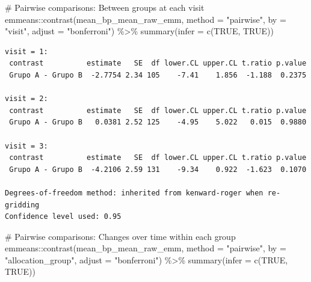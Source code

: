 \documentclass[
  letterpaper,
  DIV=11,
  numbers=noendperiod]{scrartcl}
\newenvironment{Shaded}{\begin{snugshade}}{\end{snugshade}}
\newcommand{\AttributeTok}[1]{\textcolor[rgb]{0.40,0.45,0.13}{#1}}
\newcommand{\CommentTok}[1]{\textcolor[rgb]{0.37,0.37,0.37}{#1}}
\newcommand{\ConstantTok}[1]{\textcolor[rgb]{0.56,0.35,0.01}{#1}}
\newcommand{\FunctionTok}[1]{\textcolor[rgb]{0.28,0.35,0.67}{#1}}
\newcommand{\NormalTok}[1]{\textcolor[rgb]{0.00,0.23,0.31}{#1}}
\newcommand{\SpecialCharTok}[1]{\textcolor[rgb]{0.37,0.37,0.37}{#1}}
\newcommand{\StringTok}[1]{\textcolor[rgb]{0.13,0.47,0.30}{#1}}
\begin{document}
\begin{Shaded}
\begin{Highlighting}[]
\CommentTok{\# Pairwise comparisons: Between groups at each visit}
\NormalTok{emmeans}\SpecialCharTok{::}\FunctionTok{contrast}\NormalTok{(mean\_bp\_mean\_raw\_emm, }\AttributeTok{method =} \StringTok{"pairwise"}\NormalTok{, }\AttributeTok{by =} \StringTok{"visit"}\NormalTok{, }\AttributeTok{adjust =} \StringTok{"bonferroni"}\NormalTok{) }\SpecialCharTok{\%\textgreater{}\%} \FunctionTok{summary}\NormalTok{(}\AttributeTok{infer =} \FunctionTok{c}\NormalTok{(}\ConstantTok{TRUE}\NormalTok{, }\ConstantTok{TRUE}\NormalTok{))}
\end{Highlighting}
\end{Shaded}

\begin{verbatim}
visit = 1:
 contrast          estimate   SE  df lower.CL upper.CL t.ratio p.value
 Grupo A - Grupo B  -2.7754 2.34 105    -7.41    1.856  -1.188  0.2375

visit = 2:
 contrast          estimate   SE  df lower.CL upper.CL t.ratio p.value
 Grupo A - Grupo B   0.0381 2.52 125    -4.95    5.022   0.015  0.9880

visit = 3:
 contrast          estimate   SE  df lower.CL upper.CL t.ratio p.value
 Grupo A - Grupo B  -4.2106 2.59 131    -9.34    0.922  -1.623  0.1070

Degrees-of-freedom method: inherited from kenward-roger when re-gridding 
Confidence level used: 0.95 
\end{verbatim}

\begin{Shaded}
\begin{Highlighting}[]
\CommentTok{\# Pairwise comparisons: Changes over time within each group}
\NormalTok{emmeans}\SpecialCharTok{::}\FunctionTok{contrast}\NormalTok{(mean\_bp\_mean\_raw\_emm, }\AttributeTok{method =} \StringTok{"pairwise"}\NormalTok{, }\AttributeTok{by =} \StringTok{"allocation\_group"}\NormalTok{, }\AttributeTok{adjust =} \StringTok{"bonferroni"}\NormalTok{) }\SpecialCharTok{\%\textgreater{}\%} \FunctionTok{summary}\NormalTok{(}\AttributeTok{infer =} \FunctionTok{c}\NormalTok{(}\ConstantTok{TRUE}\NormalTok{, }\ConstantTok{TRUE}\NormalTok{))}
\end{Highlighting}
\end{Shaded}
\end{document}
